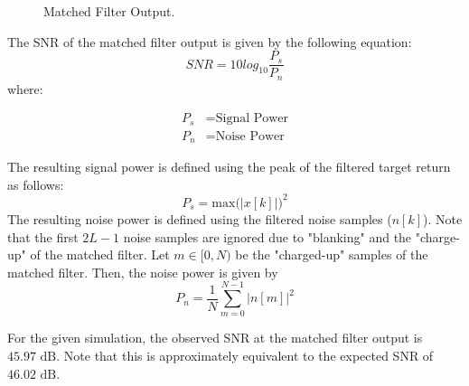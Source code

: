 \documentclass[conference]{IEEEtran}
\begin{document}
\begin{figure}[H]
\centerline{}
\caption{Matched Filter Output.}
\label{mf_output}
\end{figure}
\noindent
The SNR of the matched filter output is given by the following equation:
\begin{equation}
SNR = 10log_{10}\frac{P_s}{P_n}
\end{equation}
where:
\begin{fleqn}[\parindent]
\begin{align*}
P_s &= \text{Signal Power}\\
P_n &= \text{Noise Power}
\end{align*}
\end{fleqn}
The resulting signal power is defined using the peak of the filtered target return as follows:
\begin{equation}
P_s = \text{max(}|x[k]|\text{)}^2
\end{equation}
The resulting noise power is defined using the filtered noise samples ($n[k]$). Note that the first $2L-1$ noise samples are ignored due to "blanking" and the "charge-up" of the matched filter. Let $m \in [0, N)$ be the "charged-up" samples of the matched filter. Then, the noise power is given by
\begin{equation}
P_n = \frac{1}{N}\sum_{m=0}^{N-1}|n[m]|^2
\end{equation}
\par
For the given simulation, the observed SNR at the matched filter output is $45.97 \text{ dB}$. Note that this is approximately equivalent to the expected SNR of $46.02 \text{ dB}$.
\end{document}
